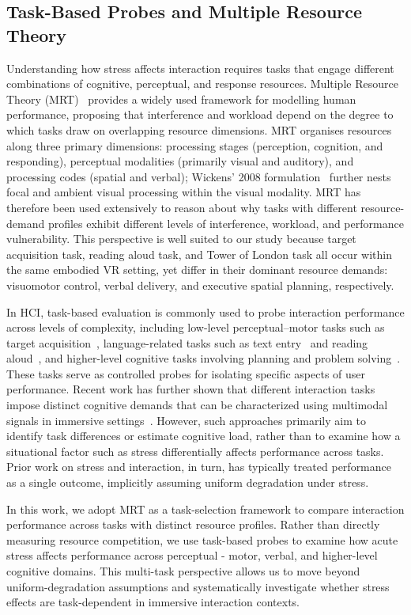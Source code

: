 \subsection{Task-Based Probes and Multiple Resource Theory}
Understanding how stress affects interaction requires tasks that engage different combinations of cognitive, perceptual, and response resources. Multiple Resource Theory (MRT)~\citep{wickens2008multiple} provides a widely used framework for modelling human performance, proposing that interference and workload depend on the degree to which tasks draw on overlapping resource dimensions. MRT organises resources along three primary dimensions: processing stages (perception, cognition, and responding), perceptual modalities (primarily visual and auditory), and processing codes (spatial and verbal); Wickens' 2008 formulation~\citep{wickens2008multiple} further nests focal and ambient visual processing within the visual modality. MRT has therefore been used extensively to reason about why tasks with different resource-demand profiles exhibit different levels of interference, workload, and performance vulnerability. This perspective is well suited to our study because target acquisition task, reading aloud task, and Tower of London task all occur within the same embodied VR setting, yet differ in their dominant resource demands: visuomotor control, verbal delivery, and executive spatial planning, respectively.

In HCI, task-based evaluation is commonly used to probe interaction performance across levels of complexity, including low-level perceptual--motor tasks such as target acquisition~\citep{fitts1964information,li2025estimating,li2025weight}, language-related tasks such as text entry~\citep{mackenzie2003phrase,sarsenbayeva2019measuring} and reading aloud~\citep{dillon2021real}, and higher-level cognitive tasks involving planning and problem solving~\citep{shallice1982specific,banakou2018virtually}. These tasks serve as controlled probes for isolating specific aspects of user performance. Recent work has further shown that different interaction tasks impose distinct cognitive demands that can be characterized using multimodal signals in immersive settings~\citep{hou2025cognitive}. However, such approaches primarily aim to identify task differences or estimate cognitive load, rather than to examine how a situational factor such as stress differentially affects performance across tasks. Prior work on stress and interaction, in turn, has typically treated performance as a single outcome, implicitly assuming uniform degradation under stress.

In this work, we adopt MRT as a task-selection framework to compare interaction performance across tasks with distinct resource profiles. Rather than directly measuring resource competition, we use task-based probes to examine how acute stress affects performance across perceptual - motor, verbal, and higher-level cognitive domains. This multi-task perspective allows us to move beyond uniform-degradation assumptions and systematically investigate whether stress effects are task-dependent in immersive interaction contexts.

